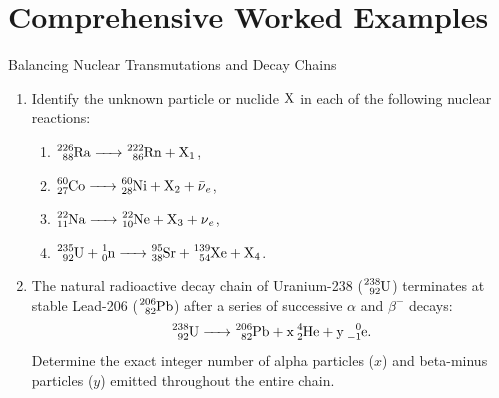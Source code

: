 \section{Comprehensive Worked Examples}

\begin{workedexample}{Balancing Nuclear Transmutations and Decay Chains}
\begin{enumerate}[leftmargin=1.4em,itemsep=3pt]
  \item Identify the unknown particle or nuclide $\ce{X}$ in each of the following nuclear reactions:
  \begin{enumerate}[leftmargin=1.2em,itemsep=2pt]
    \item $\ce{^{226}_{88}Ra -> ^{222}_{86}Rn + X_1}$,
    \item $\ce{^{60}_{27}Co -> ^{60}_{28}Ni + X_2 + \bar{\nu}_e}$,
    \item $\ce{^{22}_{11}Na -> ^{22}_{10}Ne + X_3 + \nu_e}$,
    \item $\ce{^{235}_{92}U + ^1_0n -> ^{95}_{38}Sr + ^{139}_{54}Xe + X_4}$.
  \end{enumerate}
  \item The natural radioactive decay chain of Uranium-238 ($\ce{^{238}_{92}U}$) terminates at stable Lead-206 ($\ce{^{206}_{82}Pb}$) after a series of successive $\alpha$ and $\beta^-$ decays:
  \[
  \ce{^{238}_{92}U -> ^{206}_{82}Pb + x\,^4_2He + y\,^0_{-1}e}.
  \]
  Determine the exact integer number of alpha particles ($x$) and beta-minus particles ($y$) emitted throughout the entire chain.
\end{enumerate}


\end{workedexample}
